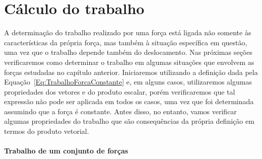 \section{Cálculo do trabalho}

A determinação do trabalho realizado por uma força está ligada não somente às características da própria força, mas também à situação específica em questão, uma vez que o trabalho depende também do deslocamento. Nas próximas seções verificaremos como determinar o trabalho em algumas situações que envolvem as forças estudadas no capítulo anterior. Iniciaremos utilizando a definição dada pela Equação~\ref{Eq:TrabalhoForcaConstante} e, em alguns casos, utilizaremos algumas propriedades dos vetores e do produto escalar, porém verificaremos que tal expressão não pode ser aplicada em todos os casos, uma vez que foi determinada assumindo que a força é constante. Antes disso, no entanto, vamos verificar algumas propriedades do trabalho que são consequências da própria definição em termos do produto vetorial.

\paragraph{Trabalho de um conjunto de forças}

